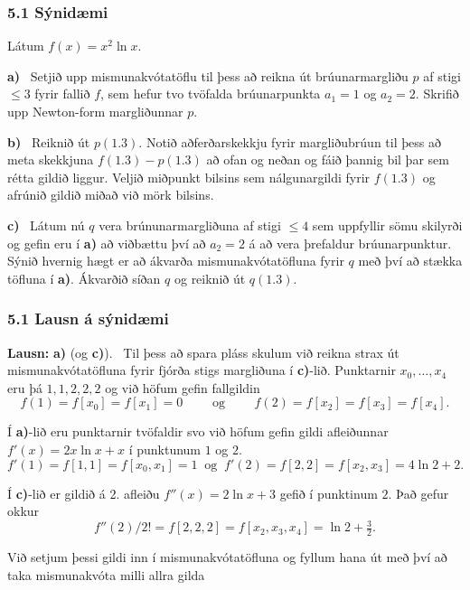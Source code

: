 \documentclass[icelandic,a4paper,12pt]{article}
\begin{document}
\subsubsection{5.1 Sýnidæmi} 
Látum $f(x)=x^2\ln x$.  

\smallskip
{\bf a)} \  Setjið upp mismunakvótatöflu til þess að 
reikna út brúunarmargliðu $p$ af stigi $\leq 3$  fyrir fallið $f$, 
sem hefur tvo tvöfalda brúunarpunkta $a_1=1$ og $a_2=2$.
Skrifið upp Newton-form margliðunnar $p$.

\pause
\smallskip
{\bf b)} \  Reiknið út  $p(1.3)$. Notið aðferðarskekkju
fyrir margliðubrúun til þess að meta skekkjuna
$f(1.3)-p(1.3)$ að ofan og neðan og fáið þannig bil
þar sem rétta gildið liggur.  Veljið miðpunkt bilsins
sem nálgunargildi fyrir $f(1.3)$ og afrúnið gildið miðað
við mörk bilsins.

\pause
\smallskip
{\bf c)} \ Látum nú $q$ vera brúnunarmargliðuna
af stigi $\leq 4$  sem uppfyllir sömu skilyrði og gefin eru í {\bf a)}
að viðbættu því að $a_2=2$ á að vera þrefaldur brúunarpunktur.
Sýnið hvernig hægt er að ákvarða  mismunakvótatöfluna fyrir $q$
með því  að stækka töfluna í {\bf a)}.  Ákvarðið síðan $q$ og 
reiknið út $q(1.3)$.


\subsubsection{5.1  Lausn á sýnidæmi} 
{\bf Lausn:}  {\bf a)} (og {\bf c)}).  \ Til þess að spara pláss 
skulum við reikna strax út
mismunakvótatöfluna fyrir fjórða stigs margliðuna í {\bf c)}-lið.
Punktarnir $x_0,\dots,x_4$ eru þá $1,1,2,2,2$ og við höfum gefin
fallgildin 
$$f(1)=f[x_0]=f[x_1]=0 \qquad  \text{ og } \qquad
f(2)=f[x_2]=f[x_3]=f[x_4].
$$

\pause
\smallskip
Í {\bf a)}-lið eru punktarnir tvöfaldir svo við höfum gefin 
gildi afleiðunnar  $f'(x)=2x\ln x+x$ í punktunum $1$ og $2$.
$$
f'(1)=f[1,1]=f[x_0,x_1]=1 \ \text{ og } \  
f'(2)=f[2,2]=f[x_2,x_3]=4\ln 2+2.
$$

\pause
\smallskip
Í {\bf c)}-lið er gildið á 2. afleiðu $f''(x)=2\ln x +3$ gefið
í punktinum $2$.  Það gefur okkur
$$f''(2)/2!=f[2,2,2]=f[x_2,x_3,x_4]=\ln 2+\tfrac 32.
$$   

\pause
Við setjum þessi gildi inn í mismunakvótatöfluna og 
fyllum hana út með því að taka mismunakvóta milli allra gilda 
\end{document}
